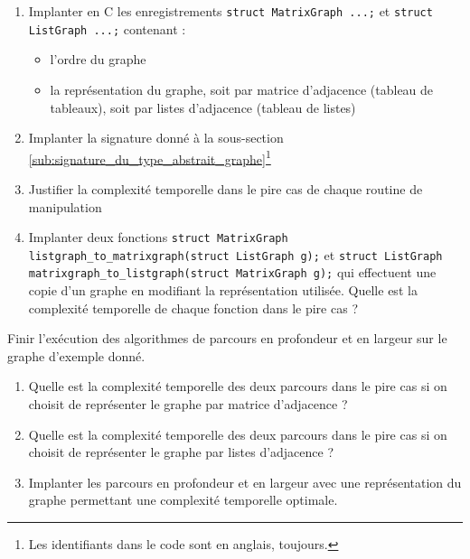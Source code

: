 \documentclass[../../../main.tex]{subfiles}
\begin{document}
\begin{enumerate}
	\item Implanter en C les enregistrements \texttt{struct MatrixGraph {...};} et \texttt{struct ListGraph {...};} contenant :
	\begin{itemize}
		\item l'ordre du graphe
		\item la représentation du graphe, soit par matrice d'adjacence (tableau de tableaux), soit par listes d'adjacence (tableau de listes)
	\end{itemize}
	\item Implanter la signature donné à la sous-section \ref{sub:signature_du_type_abstrait_graphe}\footnote{Les identifiants dans le code sont en anglais, toujours.}
	\item Justifier la complexité temporelle dans le pire cas de chaque routine de manipulation
	\item Implanter deux fonctions \texttt{struct MatrixGraph listgraph_to_matrixgraph(struct ListGraph g);} et \texttt{struct ListGraph matrixgraph_to_listgraph(struct MatrixGraph g);} qui effectuent une copie d'un graphe en modifiant la représentation utilisée. Quelle est la complexité temporelle de chaque fonction dans le pire cas ?
\end{enumerate}
 Finir l'exécution des algorithmes de parcours en profondeur et en largeur sur le graphe d'exemple donné.

\begin{enumerate}
	\item Quelle est la complexité temporelle des deux parcours dans le pire cas si on choisit de représenter le graphe par matrice d'adjacence ?
	\item Quelle est la complexité temporelle des deux parcours dans le pire cas si on choisit de représenter le graphe par listes d'adjacence ?
	\item Implanter les parcours en profondeur et en largeur avec une représentation du graphe permettant une complexité temporelle optimale.
\end{enumerate}
\end{document}
